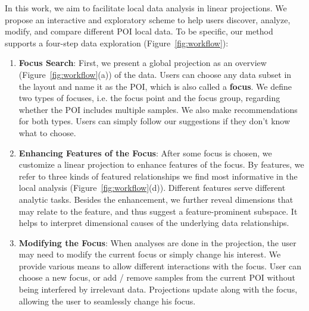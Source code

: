 In this work, we aim to facilitate local data analysis in linear projections. We propose an interactive and exploratory scheme to help users discover, analyze, modify, and compare different POI local data. To be specific, our method supports a four-step data exploration (Figure~\ref{fig:workflow}):
\begin{enumerate}[Step. 1:]
 \item \textbf{Focus Search}: First, we present a global projection as an overview (Figure~\ref{fig:workflow}(a)) of the data. Users can choose any data subset in the layout and name it as the POI, which is also called a \textbf{focus}. We define two types of focuses, i.e. the focus point and the focus group, regarding whether the POI includes multiple samples. We also make recommendations for both types. Users can simply follow our suggestions if they don't know what to choose.
 \item \textbf{Enhancing Features of the Focus}: After some focus is chosen, we customize a linear projection to enhance features of the focus. By features, we refer to three kinds of featured relationships we find most informative in the local analysis (Figure~\ref{fig:workflow}(d)). Different features serve different analytic tasks. Besides the enhancement, we further reveal dimensions that may relate to the feature, and thus suggest a feature-prominent subspace. It helps to interpret dimensional causes of the underlying data relationships.
 \item \textbf{Modifying the Focus}: When analyses are done in the projection, the user may need to modify the current focus or simply change his interest. We provide various means to allow different interactions with the focus. User can choose a new focus, or add / remove samples from the current POI without being interfered by irrelevant data. Projections update along with the focus, allowing the user to seamlessly change his focus.

\end{enumerate}
